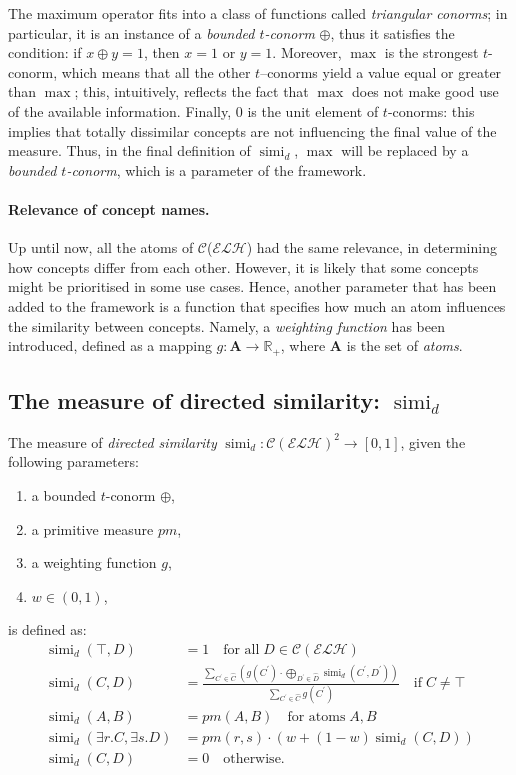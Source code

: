 \documentclass[]{llncs}
\DeclareMathOperator{\simi}{simi}
\theoremstyle{remark}
\newcommand{\elh}{\(\mathcal{ELH}{}\)}
\begin{document}
  The maximum operator fits into a class of functions called \emph{triangular conorms}; %
  in particular, it is an instance of a \emph{bounded \(t\)-conorm} \(\oplus{}\), thus it satisfies the condition: if \(x \oplus y = 1\), then \(x = 1\) or \(y = 1\).
  Moreover, \(\max\) is the strongest \(t\)-conorm, which means that all the other \(t\)--conorms yield a value equal or greater than \(\max\); this, intuitively, reflects the fact that \(\max\) does not make good use of the available information.
  Finally, \(0\) is the unit element of \(t\)-conorms: this implies that totally dissimilar concepts are not influencing the final value of the measure.
  Thus, in the final definition of \(\simi_d\), \(\max\) will be replaced by a \emph{bounded \(t\)-conorm}, which is a parameter of the framework.

  \paragraph{Relevance of concept names.}
  Up until now, all the atoms of \(\mathcal{C}\)(\elh) had the same relevance, in determining how concepts differ from each other.
  However, it is likely that some concepts might be prioritised in some use cases.
  Hence, another parameter that has been added to the framework is a function that specifies how much an atom influences the similarity between concepts. Namely, a \emph{weighting function} has been introduced, defined as a mapping \(g \colon \mathbf{A} \to \mathbb{R}_+\), where \(\mathbf{A}\) is the set of \emph{atoms}.

  \subsection{The measure of directed similarity: \(\simi_d\)}

  The measure of \emph{directed similarity} \(\simi_d \colon {\mathcal{C}(\mathcal{ELH})}^2 \to [0,1]\), given the following parameters:
  \begin{enumerate}
    \item a bounded \(t\)-conorm \(\oplus\),
    \item a primitive measure \(pm\),
    \item a weighting function \(g\),
    \item \(w \in (0,1)\),
  \end{enumerate}
  is defined as:
  \begin{align*}
    \simi_d(\top,D) &= 1 \quad
    \text{for all}\; D \in \mathcal{C}(\mathcal{ELH}) \\
    \simi_d(C,D) &=
    \frac{\sum_{C^\prime \in \widehat{C}}\left(g(C^\prime) \cdot \bigoplus_{D^\prime \in \widehat{D}} \simi_d(C^\prime, D^\prime)\right)}%
    {\sum_{C^\prime \in \widehat{C}}g(C^\prime)} \quad \text{if}\; C \ne \top \\
    \simi_d(A,B) &= pm(A,B) \quad \text{for atoms}\; A,B \\
    \simi_d(\exists{}r.C,\exists{}s.D) &=
    pm(r,s) \cdot \left(w + (1-w)\simi_d(C,D)\right) \\
    \simi_d(C,D) &= 0 \quad \text{otherwise}.
  \end{align*}
\end{document}

